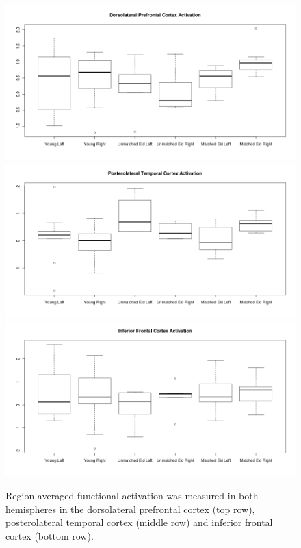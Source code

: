 \begin{figure}
\begin{center}
\includegraphics[width=0.8\linewidth]{figures/dlc_activation.png}\\
\includegraphics[width=0.8\linewidth]{figures/ptc_activation.png}\\
\includegraphics[width=0.8\linewidth]{figures/ifc_activation.png}
\caption{Region-averaged functional activation was measured in both hemispheres in the dorsolateral prefrontal cortex (top row), posterolateral temporal cortex (middle row) and inferior frontal cortex (bottom row).}
\label{fig:activations}
\end{center}
\end{figure}

